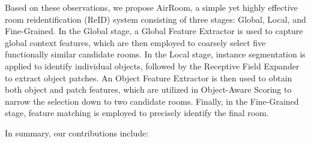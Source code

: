 
Based on these observations, we propose AirRoom, a simple yet highly effective room reidentification (ReID) system consisting of three stages: Global, Local, and Fine-Grained. In the Global stage, a Global Feature Extractor is used to capture global context features, which are then employed to coarsely select five functionally similar candidate rooms. In the Local stage, instance segmentation is applied to identify individual objects, followed by the Receptive Field Expander to extract object patches. An Object Feature Extractor is then used to obtain both object and patch features, which are utilized in Object-Aware Scoring to narrow the selection down to two candidate rooms. Finally, in the Fine-Grained stage, feature matching is employed to precisely identify the final room.

In summary, our contributions include:

